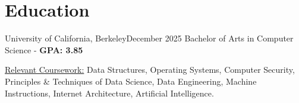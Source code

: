 \section{Education}
    \resumeSubHeadingListStart
    \resumeSubheading
    {University of California, Berkeley}{December 2025}
    {Bachelor of Arts in Computer Science - \textbf{GPA: 3.85}}{}
    \begin{itemize}[leftmargin=0.12in,label={}]
    \small{\item{
        \underline{Relevant Coursework:}{ 
            Data Structures,
            Operating Systems,
            Computer Security,
            Principles \& Techniques of Data Science,
            Data Engineering,
            Machine Instructions,
            Internet Architecture,
            Artificial Intelligence.
        }
    }}
    \end{itemize}
    \vspace{-5pt}  %
    \resumeSubHeadingListEnd